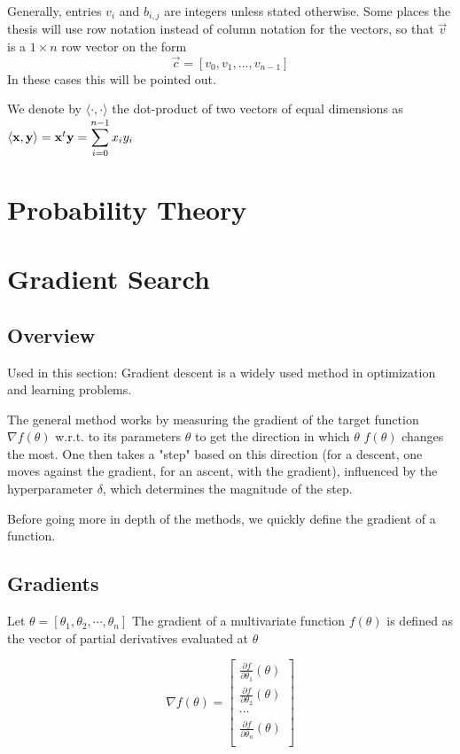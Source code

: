 Generally, entries $v_i$ and $b_{i, j}$ are integers unless stated otherwise.
Some places the thesis will use row notation instead of column notation for the vectors, so that $\vec{v}$ is a $1 \times n$ row vector on the form
\[\vec{c} = [v_0, v_1, ..., v_{n-1}]\] In these cases this will be pointed out.

We denote by $\langle \cdot, \cdot \rangle$ the dot-product of two vectors of equal dimensions as \\
$\langle \vec{x}, \vec{y} \rangle = \vec{x}^t \vec{y} = \mathlarger{\sum_{i=0}^{n-1} x_i y_i}$
\section{Probability Theory}
\section{Gradient Search}
\subsection{Overview}
Used in this section: \cite{R17}
Gradient descent is a widely used method in optimization and learning problems.

The general method works by measuring the gradient of the target function $\nabla f (\theta) $ w.r.t. to its parameters $\theta$ to get the direction 
in which $\theta$ $f(\theta)$ changes the most. 
One then takes a "step" based on this direction (for a descent, one moves against the gradient, for an ascent, with the gradient), 
influenced by the hyperparameter $\delta$, which determines the magnitude of the step.

Before going more in depth of the methods, we quickly define the gradient of a function.
\subsection{Gradients}
Let $\theta = [\theta_1, \theta_2, \cdots, \theta_n]$
The gradient of a multivariate function $f(\theta)$ is defined as the vector of partial derivatives evaluated at $\theta$

\[ \nabla f(\theta) = 
\begin{bmatrix}
\frac{\partial f}{\partial \theta_1}(\theta) \\
\frac{\partial f}{\partial \theta_2}(\theta) \\
\cdots \\
\frac{\partial f}{\partial \theta_n}(\theta) \\
\end{bmatrix}
\]

